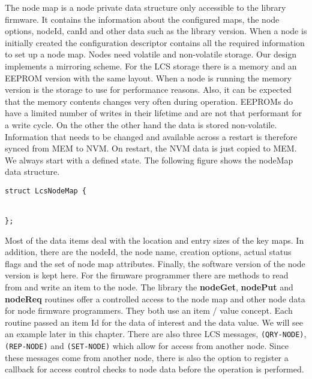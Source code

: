The node map is a node private data structure only accessible to the library firmware. It contains the information about the configured maps, the node options, nodeId, canId and other data such as the library version. When a node is initially created the configuration descriptor contains all the required information to set up a node map. Nodes need volatile and non-volatile storage. Our design implements a mirroring scheme. For the LCS storage there is a memory and an EEPROM version with the same layout. When a node is running the memory version is the storage to use for performance reasons. Also, it can be expected that the memory contents changes very often during operation. EEPROMs do have a limited number of writes in their lifetime and are not that performant for a write cycle. On the other the other hand the data is stored non-volatile. Information that needs to be changed and available across a restart is therefore synced from MEM to NVM. On restart, the NVM data is just copied to MEM. We always start with a defined state. The following figure shows the nodeMap data structure.

\lstset{language=c++, style=codesnippetstyle}

\begin{center}
\begin{lstlisting}
struct LcsNodeMap {


};
\end{lstlisting}
\end{center}
\FloatBarrier

Most of the data items deal with the location and entry sizes of the key maps. In addition, there are the nodeId, the node name, creation options, actual status flags and the set of node map attributes. Finally, the software version of the node version is kept here. For the firmware programmer there are methods to read from and write an item to the node. The library the \textbf{nodeGet}, \textbf{nodePut} and \textbf{nodeReq} routines offer a controlled access to the node map and other node data for node firmware programmers. They both use an item / value concept. Each routine passed an item Id for the data of interest and the data value. We will see an example later in this chapter. There are also three LCS messages, \texttt{(QRY-NODE)}, \texttt{(REP-NODE)} and \texttt{(SET-NODE)} which allow for access from another node. Since these messages come from another node, there is also the option to register a callback for access control checks to node data before the operation is performed.


